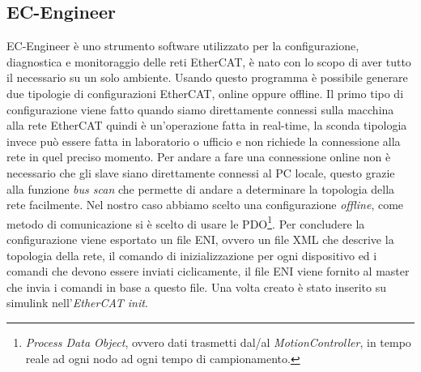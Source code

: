 \subsection{EC-Engineer}
EC-Engineer è uno strumento software utilizzato per la configurazione, diagnostica e monitoraggio delle reti EtherCAT, è nato con lo scopo di aver tutto il necessario su un solo ambiente. Usando questo programma è possibile generare due tipologie di configurazioni EtherCAT, online oppure offline. Il primo tipo di configurazione viene fatto quando siamo direttamente connessi sulla macchina alla rete EtherCAT quindi è un'operazione fatta in real-time, la sconda tipologia invece può essere fatta in laboratorio o ufficio e non richiede la connessione alla rete in quel preciso momento. Per andare a fare una connessione online non è necessario che gli slave siano direttamente connessi al PC locale, questo grazie alla funzione \textit{bus scan} che permette di andare a determinare la topologia della rete facilmente. Nel nostro caso abbiamo scelto una configurazione \textit{offline}, come metodo di comunicazione si è scelto di usare le PDO\footnote{\textit{Process Data Object}, ovvero dati trasmetti dal/al \textit{MotionController}, in tempo reale ad ogni nodo ad ogni tempo di campionamento.}. Per concludere la configurazione viene esportato un file ENI,
ovvero un file XML che descrive la topologia della rete, il comando di inizializzazione per ogni dispositivo ed i comandi che devono essere inviati ciclicamente, il file ENI viene fornito al master che invia i comandi in base a questo file. Una volta creato è stato inserito su simulink nell'\textit{EtherCAT init}.
